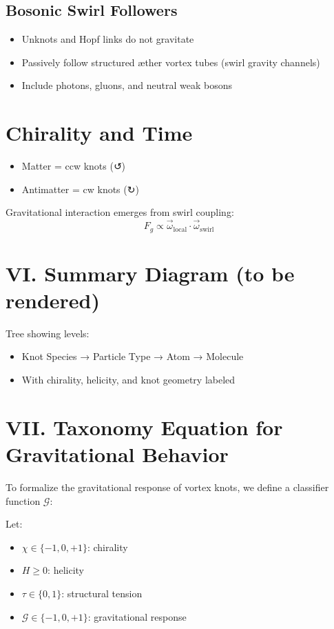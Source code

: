 \documentclass[12pt]{article}
\begin{document}
\subsection*{Bosonic Swirl Followers}
\begin{itemize}
    \item Unknots and Hopf links do not gravitate
    \item Passively follow structured æther vortex tubes (swirl gravity channels)
    \item Include photons, gluons, and neutral weak bosons
\end{itemize}

\section*{Chirality and Time}
\begin{itemize}
    \item Matter = ccw knots (↺)
    \item Antimatter = cw knots (↻)
\end{itemize}
Gravitational interaction emerges from swirl coupling:
\[
F_g \propto \vec{\omega}_\text{local} \cdot \vec{\omega}_\text{swirl}
\]

\section*{VI. Summary Diagram (to be rendered)}
Tree showing levels:
\begin{itemize}
    \item Knot Species → Particle Type → Atom → Molecule
    \item With chirality, helicity, and knot geometry labeled
\end{itemize}

\section*{VII. Taxonomy Equation for Gravitational Behavior}

To formalize the gravitational response of vortex knots, we define a classifier function \( \mathcal{G} \):

Let:
\begin{itemize}
    \item \( \chi \in \{-1, 0, +1\} \): chirality
    \item \( H \geq 0 \): helicity
    \item \( \tau \in \{0,1\} \): structural tension
    \item \( \mathcal{G} \in \{-1, 0, +1\} \): gravitational response
\end{itemize}
\end{document}
